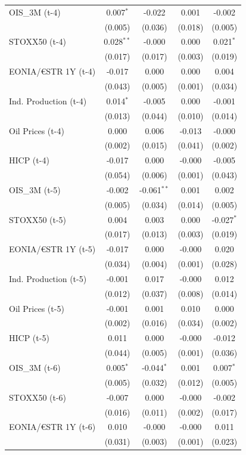 \begin{longtable}[t]{lcccc}
OIS\_3M (t-4) & 0.007$^{*}$ & -0.022 & 0.001 & -0.002\\
 & (0.005) & (0.036) & (0.018) & (0.005)\\
STOXX50 (t-4) & 0.028$^{**}$ & -0.000 & 0.000 & 0.021$^{*}$\\
 & (0.017) & (0.017) & (0.003) & (0.019)\\
EONIA/€STR 1Y (t-4) & -0.017 & 0.000 & 0.000 & 0.004\\
 & (0.043) & (0.005) & (0.001) & (0.034)\\
Ind. Production (t-4) & 0.014$^{*}$ & -0.005 & 0.000 & -0.001\\
 & (0.013) & (0.044) & (0.010) & (0.014)\\
Oil Prices (t-4) & 0.000 & 0.006 & -0.013 & -0.000\\
 & (0.002) & (0.015) & (0.041) & (0.002)\\
HICP (t-4) & -0.017 & 0.000 & -0.000 & -0.005\\
 & (0.054) & (0.006) & (0.001) & (0.043)\\
OIS\_3M (t-5) & -0.002 & -0.061$^{**}$ & 0.001 & 0.002\\
 & (0.005) & (0.034) & (0.014) & (0.005)\\
STOXX50 (t-5) & 0.004 & 0.003 & 0.000 & -0.027$^{*}$\\
 & (0.017) & (0.013) & (0.003) & (0.019)\\
EONIA/€STR 1Y (t-5) & -0.017 & 0.000 & -0.000 & 0.020\\
 & (0.034) & (0.004) & (0.001) & (0.028)\\
Ind. Production (t-5) & -0.001 & 0.017 & -0.000 & 0.012\\
 & (0.012) & (0.037) & (0.008) & (0.014)\\
Oil Prices (t-5) & -0.001 & 0.001 & 0.010 & 0.000\\
 & (0.002) & (0.016) & (0.034) & (0.002)\\
HICP (t-5) & 0.011 & 0.000 & -0.000 & -0.012\\
 & (0.044) & (0.005) & (0.001) & (0.036)\\
OIS\_3M (t-6) & 0.005$^{*}$ & -0.044$^{*}$ & 0.001 & 0.007$^{*}$\\
 & (0.005) & (0.032) & (0.012) & (0.005)\\
STOXX50 (t-6) & -0.007 & 0.000 & -0.000 & -0.002\\
 & (0.016) & (0.011) & (0.002) & (0.017)\\
EONIA/€STR 1Y (t-6) & 0.010 & -0.000 & -0.000 & 0.011\\
 & (0.031) & (0.003) & (0.001) & (0.023)\\

\end{longtable}
